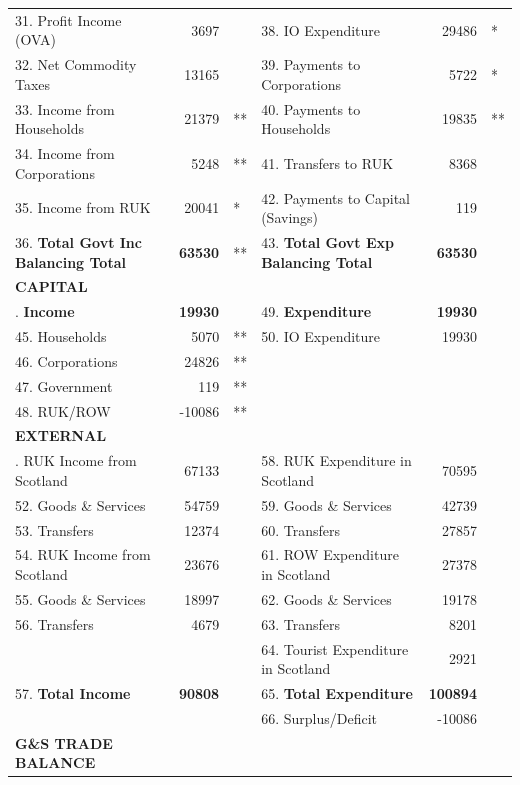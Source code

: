 \begin{table}[H]
\begin{scriptsize}
\begin{centering}
\begin{spacing}{1.2}
\begin{tabular}{lrllrl}
       31. Profit Income (OVA) & 3697 & & 38. IO Expenditure & 29486 & * \\
       32. Net Commodity Taxes & 13165 & & 39. Payments to Corporations & 5722 &* \\
       33. Income from Households & 21379 &** & 40. Payments to Households & 19835 &** \\
       34. Income from Corporations & 5248 &** & 41. Transfers to RUK & 8368 & \\
       35. Income from RUK & 20041 &* & 42. Payments to Capital (Savings) & 119 & \\
       36. \textbf{Total Govt Inc Balancing Total} & \textbf{63530} &** & 43. \textbf{Total Govt Exp Balancing Total} & \textbf{63530} &  \\ 
    \hline
    \textbf{CAPITAL} \bigstrut\\
    \hline
\bigstrut[t]       44. \textbf{Income} & \textbf{19930}  &   & 49. \textbf{Expenditure} & \textbf{19930} & \\
       45. Households & 5070 &** & 50. IO Expenditure & 19930 &  \\
       46. Corporations & 24826 &** &  \\
       47. Government & 119 &** &  \\
       48. RUK/ROW & -10086 &** &  \\ 
    \hline
    \textbf{EXTERNAL} \bigstrut\\
    \hline
\bigstrut[t]  51. RUK Income from Scotland & 67133  &   & 58. RUK Expenditure in Scotland & 70595 & \\
       52. Goods \& Services & 54759 & & 59. Goods \& Services & 42739 & \\
       53. Transfers & 12374 & & 60. Transfers & 27857 & \\
       54. RUK Income from Scotland & 23676 & & 61. ROW Expenditure in Scotland & 27378 & \\
       55. Goods \& Services & 18997 & & 62. Goods \& Services & 19178 & \\
       56. Transfers & 4679 & & 63. Transfers & 8201 & \\
       & & & 64. Tourist Expenditure in Scotland & 2921 & \\
       57. \textbf{Total Income} & \textbf{90808} & & 65. \textbf{Total Expenditure} & \textbf{100894} &  \\  
        & & & 66. Surplus/Deficit &-10086 & \\   
    \hline
    \textbf{G\&S TRADE BALANCE} \bigstrut\\

\end{tabular}
\end{spacing}
\end{centering}
\end{scriptsize}
\end{table}
